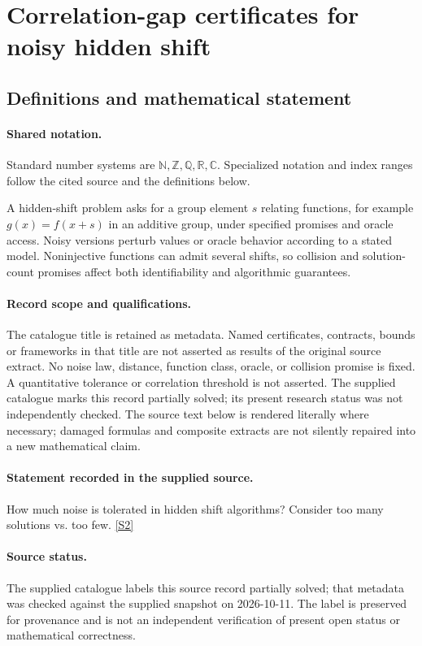 \documentclass[11pt]{article}
\newcommand{\sref}[2]{\hyperlink{source:#1:#2}{[S#2]}}
\begin{document}
\section{Correlation-gap certificates for noisy hidden shift}\label{statement}

\subsection{Definitions and mathematical statement}

\paragraph{Shared notation.}Standard number systems are $\mathbb N,\mathbb Z,\mathbb Q,\mathbb R,\mathbb C$. Specialized notation and index ranges follow the cited source and the definitions below.


A hidden-shift problem asks for a group element $s$ relating functions, for example $g(x)=f(x+s)$ in an additive group, under specified promises and oracle access. Noisy versions perturb values or oracle behavior according to a stated model. Noninjective functions can admit several shifts, so collision and solution-count promises affect both identifiability and algorithmic guarantees.
\paragraph{Record scope and qualifications.}
The catalogue title is retained as metadata. Named certificates, contracts, bounds or frameworks in that title are not asserted as results of the original source extract.
No noise law, distance, function class, oracle, or collision promise is fixed. A quantitative tolerance or correlation threshold is not asserted. The supplied catalogue marks this record partially solved; its present research status was not independently checked.
The source text below is rendered literally where necessary; damaged formulas and composite extracts are not silently repaired into a new mathematical claim.
\paragraph{Statement recorded in the supplied source.}
How much noise is tolerated in hidden shift algorithms? Consider too many solutions vs. too few. \sref{statement}{2}
\paragraph{Source status.}
The supplied catalogue labels this source record partially solved; that metadata was checked against the supplied snapshot on 2026-10-11. The label is preserved for provenance and is not an independent verification of present open status or mathematical correctness.
\end{document}
